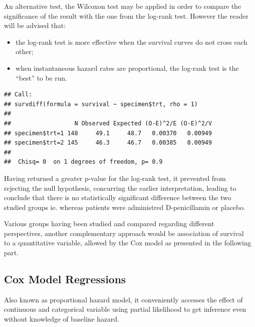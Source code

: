 \documentclass[]{article}
\newenvironment{Shaded}{\begin{snugshade}}{\end{snugshade}}
\newcommand{\KeywordTok}[1]{\textcolor[rgb]{0.13,0.29,0.53}{\textbf{#1}}}
\newcommand{\DataTypeTok}[1]{\textcolor[rgb]{0.13,0.29,0.53}{#1}}
\newcommand{\DecValTok}[1]{\textcolor[rgb]{0.00,0.00,0.81}{#1}}
\newcommand{\StringTok}[1]{\textcolor[rgb]{0.31,0.60,0.02}{#1}}
\newcommand{\OperatorTok}[1]{\textcolor[rgb]{0.81,0.36,0.00}{\textbf{#1}}}
\newcommand{\NormalTok}[1]{#1}
\providecommand{\tightlist}{%
  \setlength{\itemsep}{0pt}\setlength{\parskip}{0pt}}
\begin{document}
An alternative test, the Wilcoxon test may be applied in order to
compare the significance of the result with the one from the log-rank
test. However the reader will be advised that:

\begin{itemize}
\tightlist
\item
  the log-rank test is more effective when the survival curves do not
  cross each other;
\item
  when instantaneous hazard rates are proportional, the log-rank test is
  the ``best'' to be run.
\end{itemize}

\begin{Shaded}
\end{Shaded}

\begin{verbatim}
## Call:
## survdiff(formula = survival ~ specimen$trt, rho = 1)
## 
##                  N Observed Expected (O-E)^2/E (O-E)^2/V
## specimen$trt=1 148     49.1     48.7   0.00370   0.00949
## specimen$trt=2 145     46.3     46.7   0.00385   0.00949
## 
##  Chisq= 0  on 1 degrees of freedom, p= 0.9
\end{verbatim}

Having returned a greater p-value for the log-rank test, it prevented
from rejecting the null hypothesis, concurring the earlier
interpretation, leading to conclude that there is no statistically
significant difference between the two studied groups ie. whereas
patients were administred D-penicillamin or placebo.

Various groups having been studied and compared regarding different
perspectives, another complementary approach would be association of
survival to a quantitative variable, allowed by the Cox model as
presented in the following part.

\subsection{Cox Model Regressions}\label{cox-model-regressions}

Also known as proportional hazard model, it conveniently accesses the
effect of continuous and categorical variable using partial likelihood
to get inference even without knowledge of baseline hazard.
\end{document}
